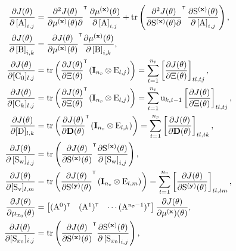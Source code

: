 \begin{align}
        \pdv{J(\vctheta)}{\left[ \mxA \right]_{i,j}} &= \pdv{J(\vctheta)}{\mu^{(\mathbf{x})}(\vctheta)}{}^\tr\, \pdv{\mu^{(\mathbf{x})}(\vctheta)}{\left[\mxA \right]_{i,j}} 
        + 
        \trace\left(\pdv{J(\vctheta)}{\mxS^{(\mathbf{x})}(\vctheta)}{}^\tr\, \pdv{\mxS^{(\mathbf{x})}(\vctheta)}{\left[ \mxA \right]_{i,j}} \right), 
        \label{eq:J derivative A1}\\
        \pdv{J(\vctheta)}{\left[ \mxB \right]_{i,k}} &=  \pdv{J(\vctheta)}{\mu^{(\mathbf{x})}(\vctheta)}^\tr \pdv{\mu^{(\mathbf{x})}(\vctheta)}{\left[\mxB \right]_{i,k}}, 
        \\
        \pdv{J(\vctheta)}{[\mxC_0]_{l,j}} &= \trace \left( \pdv{J(\vctheta)}{\Xi(\vctheta)}^\tr \left( \mathbf{I}_{\nsD} \otimes \mxE_{l,j} \right) \right)
        = \sum_{t=1}^\nsD \left[ \pdv{J(\vctheta)}{\Xi(\vctheta)} \right]_{tl,tj}, 
        \label{eq:J derivative C0}\\
        \pdv{J(\vctheta)}{[\mxC_k]_{l,j}} &= \trace \left( \pdv{J(\vctheta)}{\Xi(\vctheta)}^\tr \left( \mathbf{I}_{\nsD} \otimes \mxE_{l,j} \right) \right)
        = \sum_{t=1}^\nsD \vcu_{k,t-1} \left[ \pdv{J(\vctheta)}{\Xi(\vctheta)} \right]_{tl,tj}, 
        \label{eq:J derivative Ci}\\
        \pdv{J(\vctheta)}{[\mxD]_{l,k}} &= \trace\left(\pdv{J(\vctheta)}{\mathbf{D}(\vctheta)}^\tr \left( \mathbf{I}_{\nsD} \otimes \mxE_{l,k} \right) \right)
         = \sum_{t=1}^\nsD \left[ \pdv{J(\vctheta)}{\mathbf{D}(\vctheta)} \right]_{tl,tk}, 
         \label{eq:J derivative D}\\
        \pdv{J(\vctheta)}{\left[\mxS_\vcw \right]_{i,j}} &= \trace \left( \pdv{J(\vctheta)}{\mxS^{(\mathbf{x})}(\vctheta)}^\tr \pdv{\mxS^{(\mathbf{x})}(\vctheta)}{\left[ \mxS_\vcw \right]_{i,j}} \right), 
        \\
        \pdv{J(\vctheta)}{[\mxS_\vcv]_{l,m}} &= \trace\left(\pdv{J(\vctheta)}{\mxS^{(\mathbf{y})}(\vctheta)}^\tr \left( \mathbf{I}_{\nsD} \otimes \mxE_{l,m} \right) \right)
         = \sum_{t=1}^\nsD \left[ \pdv{J(\vctheta)}{\mxS^{(\mathbf{y})}(\vctheta)} \right]_{tl,tm}, 
        \label{eq:J derivative Sv}\\
        \pdv{J(\vctheta)}{ \mu_{x_0}(\vctheta) } &= \begin{bmatrix}
            (\mxA^{0})^{\tr} & (\mxA^{1})^\tr & \cdots (\mxA^{\nsD-1})^\tr
        \end{bmatrix} \pdv{J(\vctheta)}{\mu^{(\mathbf{x}})(\vctheta)},
        \label{eq:J derivative mux0}\\
        \pdv{J(\vctheta)}{[\mxS_{x_0}]_{i,j}} &= \trace\left(\pdv{J(\vctheta)}{\mxS^{(\mathbf{x})}(\vctheta)}^\tr \pdv{\mxS^{(\mathbf{x})}(\vctheta)}{\left[ \mxS_{x_0} \right]_{i,j}} \right), 
        \label{eq:J derivative muS0}
\end{align}
